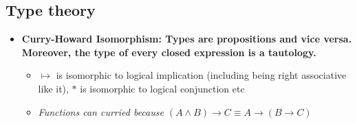 \documentclass[20pt,a4paper,landscape]{extarticle}
\begin{document}
\begin{flushleft}
\subsection{Type theory}
\begin{itemize}
\item \textbf{Curry-Howard Isomorphism: Types are propositions and vice versa. Moreover, the type of every closed expression is a tautology.}
    \begin{itemize}
    \item $\mapsto$ is isomorphic to logical implication (including being right associative like it), $\ast$ is isomorphic to logical conjunction etc
    \item \textit{Functions can curried because $(A \land B) \rightarrow C \equiv A \rightarrow (B \rightarrow C)$}
    \end{itemize}
\end{itemize}
\clearpage

\end{flushleft}
\end{document}

